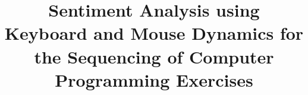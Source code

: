 \documentclass{acm_proc_article-sp}
\begin{document}
\title{Sentiment Analysis using Keyboard and Mouse Dynamics for the
  Sequencing of Computer Programming Exercises}

%
%
%
%
%
\end{document}
